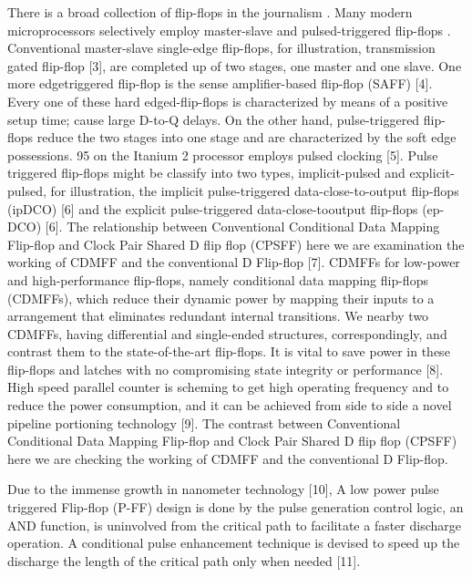 \documentclass{article}
\begin{document}
	
	 There is a broad collection of flip-flops in the journalism \cite{designZhao2011}. Many modern microprocessors selectively employ
	 master-slave and pulsed-triggered flip-flops \cite{EfficientUmadevi2013}.
	 Conventional master-slave single-edge flip-flops, for
	 illustration, transmission gated flip-flop [3], are completed
	 up of two stages, one master and one slave. One more edgetriggered
	 flip-flop is the sense amplifier-based flip-flop
	 (SAFF) [4]. Every one of these hard edged-flip-flops is
	 characterized by means of a positive setup time; cause large
	 D-to-Q delays. On the other hand, pulse-triggered flip-flops
	 reduce the two stages into one stage and are characterized by
	 the soft edge possessions. 95%
	 on the Itanium 2 processor employs pulsed clocking [5].
	 Pulse triggered flip-flops might be classify into two types,
	 implicit-pulsed and explicit-pulsed, for illustration, the
	 implicit pulse-triggered data-close-to-output flip-flops (ipDCO)
	 [6] and the explicit pulse-triggered data-close-tooutput
	 flip-flops (ep-DCO) [6]. The relationship between
	 Conventional Conditional Data Mapping Flip-flop and
	 Clock Pair Shared D flip flop (CPSFF) here we are
	 examination the working of CDMFF and the conventional D
	 Flip-flop [7]. CDMFFs for low-power and high-performance
	 flip-flops, namely conditional data mapping flip-flops
	 (CDMFFs), which reduce their dynamic power by mapping
	 their inputs to a arrangement that eliminates redundant
	 internal transitions. We nearby two CDMFFs, having
	 differential and single-ended structures, correspondingly,
	 and contrast them to the state-of-the-art flip-flops. It is vital
	 to save power in these flip-flops and latches with no
	 compromising state integrity or performance [8]. High speed
	 parallel counter is scheming to get high operating frequency
	 and to reduce the power consumption, and it can be achieved
	 from side to side a novel pipeline portioning technology [9].
	 The contrast between Conventional Conditional Data
	 Mapping Flip-flop and Clock Pair Shared D flip flop
	 (CPSFF) here we are checking the working of CDMFF and
	 the conventional D Flip-flop.
	 
	 Due to the immense growth in nanometer technology [10], A
	 low power pulse triggered Flip-flop (P-FF) design is done by
	 the pulse generation control logic, an AND function, is
	 uninvolved from the critical path to facilitate a faster
	 discharge operation. A conditional pulse enhancement
	 technique is devised to speed up the discharge the length of
	 the critical path only when needed [11].
\end{document}
